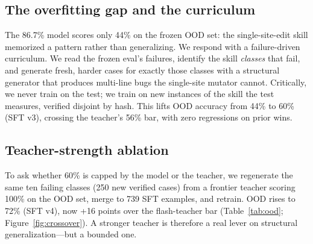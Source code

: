 \documentclass[10pt,twocolumn]{article}
\begin{document}
\subsection{The overfitting gap and the curriculum}

The 86.7\% model scores only 44\% on the frozen OOD set: the single-site-edit
skill memorized a pattern rather than generalizing. We respond with a
failure-driven curriculum. We read the frozen eval's failures, identify the
skill \emph{classes} that fail, and generate fresh, harder cases for exactly
those classes with a structural generator that produces multi-line bugs the
single-site mutator cannot. Critically, we never train on the test; we train on
new instances of the skill the test measures, verified disjoint by hash. This
lifts OOD accuracy from 44\% to 60\% (SFT v3), crossing the teacher's 56\% bar,
with zero regressions on prior wins.

\subsection{Teacher-strength ablation}

To ask whether 60\% is capped by the model or the teacher, we regenerate the same
ten failing classes (250 new verified cases) from a frontier teacher scoring
100\% on the OOD set, merge to 739 SFT examples, and retrain. OOD rises to 72\%
(SFT v4), now +16 points over the flash-teacher bar (Table~\ref{tab:ood};
Figure~\ref{fig:crossover}). A
stronger teacher is therefore a real lever on structural generalization---but a
bounded one.
\end{document}

